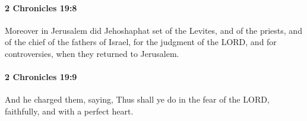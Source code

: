 		\paragraph{2 Chronicles 19:8} %
			\label{2CHRONICLES-19-8}

			Moreover in Jerusalem did Jehoshaphat set of the Levites, and of the priests, and of the chief of the fathers of Israel, for the judgment of the LORD, and for controversies, when they returned to Jerusalem.


		\paragraph{2 Chronicles 19:9} %
			\label{2CHRONICLES-19-9}

			And he charged them, saying, Thus shall ye do in the fear of the LORD, faithfully, and with a perfect heart.


